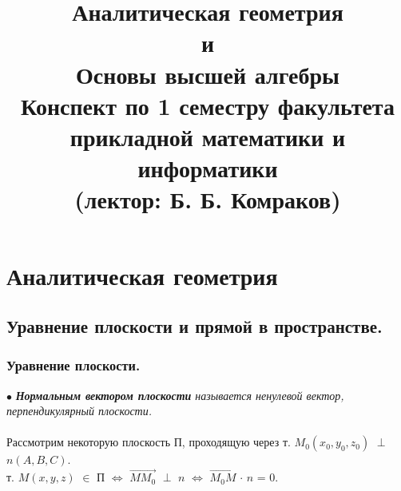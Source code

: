 \documentclass[a4paper, 12pt]{report}
\title{\textbf{\Huge{Аналитическая геометрия\\ и\\ Основы высшей алгебры}}\\Конспект по 1 семестру факультета прикладной математики и информатики\\(лектор: Б. Б. Комраков)}
\date{}
\begin{document}
	\maketitle
	\tableofcontents{}
	
	
	\part{Аналитическая геометрия}
	
	
	
	
	\chapter{Уравнение плоскости и прямой в пространстве.}
	\section{Уравнение плоскости.}
	$\bullet$ \textit{\textbf{Нормальным вектором плоскости} называется ненулевой вектор, перпендикулярный плоскости.} \\\\
	Рассмотрим некоторую плоскость П, проходящую через т. $M_0 (x_0, y_0, z_0)$ $\perp$ $n(A, B, C).$ \\ т. $M(x, y, z)$ $\in$ П $\Longleftrightarrow$ $\overrightarrow{M M_0}$ $\perp$ $n$ $\Longleftrightarrow$ $\overrightarrow{M_0 M}$ $\cdot$ $n$ = $0$.\\\\
\end{document}
